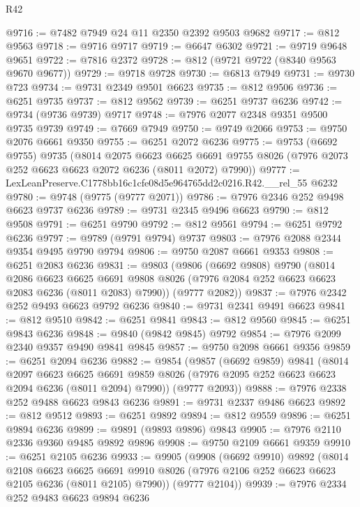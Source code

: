 \begin{lexlean}{R42}
\begin{coremodule}
{@9716 := @7482 @7949 @24 @11 @2350 @2392 @9503 @9682
@9717 := @812 @9563
@9718 := @9716 @9717
@9719 := @6647 @6302
@9721 := @9719 @9648 @9651
@9722 := @7816 @2372
@9728 := @812 (@9721 @9722 (@8340 @9563 @9670 @9677))
@9729 := @9718 @9728
@9730 := @6813 @7949
@9731 := @9730 @723
@9734 := @9731 @2349 @9501 @6623
@9735 := @812 @9506
@9736 := @6251 @9735
@9737 := @812 @9562
@9739 := @6251 @9737 @6236
@9742 := @9734 (@9736 @9739) @9717
@9748 := @7976 @2077 @2348 @9351 @9500 @9735 @9739
@9749 := @7669 @7949
@9750 := @9749 @2066
@9753 := @9750 @2076 @6661 @9350
@9755 := @6251 @2072 @6236
@9775 := @9753
    (@6692 @9755)
    @9735
    (@8014
      @2075
      @6623
      @6625
      @6691
      @9755
      @8026
      (@7976 @2073 @252 @6623 @6623 @2072 @6236 (@8011 @2072) @7990))
@9777 := LexLeanPreserve.C1778bb16c1cfe08d5e964765dd2c0216.R42.__rel_55 @6232
@9780 := @9748 (@9775 (@9777 @2071))
@9786 := @7976 @2346 @252 @9498 @6623 @9737 @6236
@9789 := @9731 @2345 @9496 @6623
@9790 := @812 @9508
@9791 := @6251 @9790
@9792 := @812 @9561
@9794 := @6251 @9792 @6236
@9797 := @9789 (@9791 @9794) @9737
@9803 := @7976 @2088 @2344 @9354 @9495 @9790 @9794
@9806 := @9750 @2087 @6661 @9353
@9808 := @6251 @2083 @6236
@9831 := @9803
    (@9806
      (@6692 @9808)
      @9790
      (@8014
        @2086
        @6623
        @6625
        @6691
        @9808
        @8026
        (@7976 @2084 @252 @6623 @6623 @2083 @6236 (@8011 @2083) @7990))
      (@9777 @2082))
@9837 := @7976 @2342 @252 @9493 @6623 @9792 @6236
@9840 := @9731 @2341 @9491 @6623
@9841 := @812 @9510
@9842 := @6251 @9841
@9843 := @812 @9560
@9845 := @6251 @9843 @6236
@9848 := @9840 (@9842 @9845) @9792
@9854 := @7976 @2099 @2340 @9357 @9490 @9841 @9845
@9857 := @9750 @2098 @6661 @9356
@9859 := @6251 @2094 @6236
@9882 := @9854
    (@9857
      (@6692 @9859)
      @9841
      (@8014
        @2097
        @6623
        @6625
        @6691
        @9859
        @8026
        (@7976 @2095 @252 @6623 @6623 @2094 @6236 (@8011 @2094) @7990))
      (@9777 @2093))
@9888 := @7976 @2338 @252 @9488 @6623 @9843 @6236
@9891 := @9731 @2337 @9486 @6623
@9892 := @812 @9512
@9893 := @6251 @9892
@9894 := @812 @9559
@9896 := @6251 @9894 @6236
@9899 := @9891 (@9893 @9896) @9843
@9905 := @7976 @2110 @2336 @9360 @9485 @9892 @9896
@9908 := @9750 @2109 @6661 @9359
@9910 := @6251 @2105 @6236
@9933 := @9905
    (@9908
      (@6692 @9910)
      @9892
      (@8014
        @2108
        @6623
        @6625
        @6691
        @9910
        @8026
        (@7976 @2106 @252 @6623 @6623 @2105 @6236 (@8011 @2105) @7990))
      (@9777 @2104))
@9939 := @7976 @2334 @252 @9483 @6623 @9894 @6236
}
\end{coremodule}
\end{lexlean}
